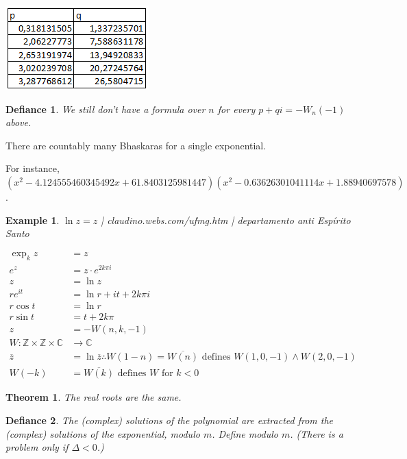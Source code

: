 \documentclass[12pt,a4paper]{article}
\newtheorem{defy}{Defiance}
\newtheorem{thm}{Theorem}[section]
\newtheorem{example}{Example}[section]
\begin{document}
		\begin{center}
		\includegraphics{tabelaPontoFixo}
		\end{center}

\begin{defy}
We still don't have a formula over $n$ for every $p + qi = - W_n(-1)$ above.
\end{defy}

There are countably many Bhaskaras for a single exponential.

For instance, $(x^2 - 4.124555460345492 x + 61.8403125981447) (x^2 - 0.63626301041114 x + 1.88940697578)$.

\begin{example} $\ln z = z$ | claudino.webs.com/ufmg.htm | departamento anti Esp\'irito Santo
\end{example}

\begin{align}
\exp_k z &= z \\
e^z &= z \cdot e^{2k\pi i} \\
z &= \ln z \\
re^{it} &= \ln r + it + 2k\pi i \\
r \cos t &= \ln r \\
r \sin t &= t + 2k\pi \\
z &= - W(n, k, -1) \\
W : \mathbb{Z} \times \mathbb{Z} \times \mathbb{C} &\rightarrow \mathbb{C} \\
\overline{z} &= \ln \overline{z} \therefore W(1-n) = \overline{W(n)} \text{ defines } W(1,0,-1) \wedge W(2,0,-1) \\
W(-k) &= \overline{W(k)} \text{ defines }W\text{ for }k < 0
\end{align}

\begin{thm}
The real roots are the same.
\end{thm}

\begin{defy}
The (complex) solutions of the polynomial are extracted from the (complex) solutions of the exponential, modulo $m$. Define modulo $m$. (There is a problem only if $\Delta < 0$.)
\end{defy}
\end{document}
